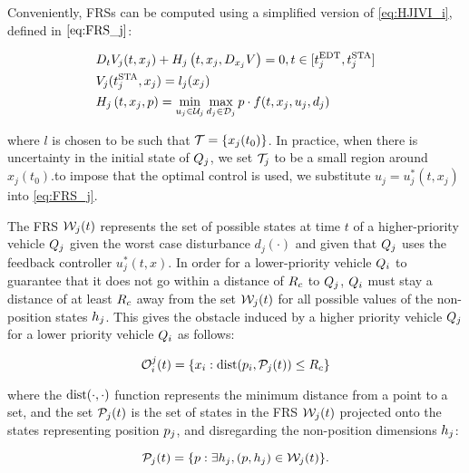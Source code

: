 Conveniently, FRSs can be computed using a simplified version of \eqref{eq:HJIVI_i}, defined in $\eqref{eq:FRS_j}$:

\begin{equation}
\label{eq:FRS_j}
\begin{aligned}
&D_t V_j(t, x_j) + H_j\left(t, x_j, D_{x_j} V\right) = 0, t \in [t^\text{EDT}_j, t^\text{STA}_j]\\
&V_j(t^\text{STA}_j, x_j) =l_j(x_j) \\
&H_j\left(t, x_j, p\right) = \min_{u_j \in \mathcal{U}_j} \max_{d_j \in \mathcal{D}_j} p \cdot f(t, x_j, u_j, d_j)
\end{aligned}
\end{equation}

\noindent where $l$ is chosen to be such that $\mathcal{T} = \{x_j(t_0)\}$. In practice, when there is uncertainty in the initial state of $Q_j$, we set $\mathcal{T}_j$ to be a small region around $x_j(t_0)$.to impose that the optimal control is used, we substitute $u_j = u_j^*(t, x_j)$ into \eqref{eq:FRS_j}.

The FRS $\mathcal{W}_j(t)$ represents the set of possible states at time $t$ of a higher-priority vehicle $Q_j$ given the worst case disturbance $d_j(\cdot)$ and given that $Q_j$ uses the feedback controller $u_j^*(t, x)$. In order for a lower-priority vehicle $Q_i$ to guarantee that it does not go within a distance of $R_c$ to $Q_j$, $Q_i$ must stay a distance of at least $R_c$ away from the set $\mathcal{W}_j(t)$ for all possible values of the non-position states $h_j$. This gives the obstacle induced by a higher priority vehicle $Q_j$ for a lower priority vehicle $Q_i$ as follows:

\begin{equation}
\mathcal{O}_i^j(t) = \{x_i: \text{dist}(p_i, \mathcal{P}_j(t)) \le R_c \}
\end{equation}

\noindent where the $\text{dist}(\cdot, \cdot)$ function represents the minimum distance from a point to a set, and the set $\mathcal{P}_j(t)$ is the set of states in the FRS $\mathcal{W}_j(t)$ projected onto the states representing position $p_j$, and disregarding the non-position dimensions $h_j$:

\begin{equation}
\mathcal{P}_j(t) = \{p: \exists h_j, (p, h_j) \in \mathcal{W}_j(t)\}.
\end{equation}

